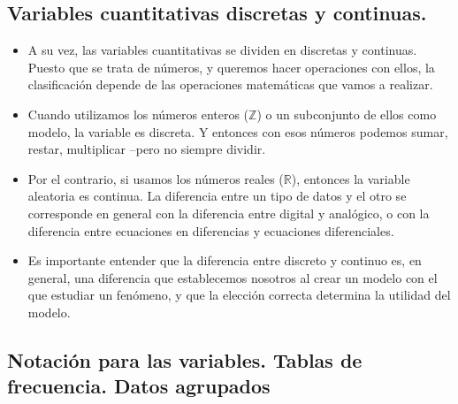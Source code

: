\subsection{Variables cuantitativas discretas y continuas.}

\begin{itemize}
    \item A su vez, las variables cuantitativas se dividen en {\sf discretas} y {\sf continuas}. Puesto que se trata de números, y queremos hacer operaciones con ellos, la clasificación depende de las operaciones matemáticas que vamos a realizar.
    \item Cuando utilizamos los {\sf números enteros} ($\mathbb Z$) o un subconjunto de ellos como modelo, la variable es discreta. Y entonces con esos números podemos sumar, restar, multiplicar --pero no siempre dividir.
    \item Por el contrario, si usamos {\sf los números reales} ($\mathbb R$), entonces la variable aleatoria es continua. La diferencia entre un tipo de datos y el otro se corresponde en general con la diferencia entre digital y analógico, o con la diferencia entre ecuaciones en diferencias y ecuaciones diferenciales.
    \item Es importante entender que la diferencia entre discreto y continuo es, en general, una diferencia que establecemos nosotros al crear un {\sf modelo} con el que estudiar un fenómeno, y que la elección correcta determina la utilidad del modelo.
\end{itemize}

\subsection{Notación para las variables. Tablas de frecuencia. Datos agrupados}

